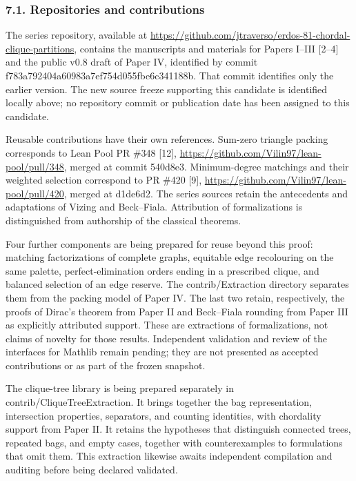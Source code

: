 \documentclass[english,11pt,a4paper]{article}
\begin{document}
\subsubsection{7.1. Repositories and contributions}\label{repositories-and-contributions}

The series repository, available at \url{https://github.com/jtraverso/erdos-81-chordal-clique-partitions}, contains the manuscripts and materials for Papers I--III {[}2--4{]} and the public v0.8 draft of Paper IV, identified by commit {\ttfamily\small f783a792404a\discretionary{\hbox{\ensuremath{\hookrightarrow}}}{}{}60983a7ef754\discretionary{\hbox{\ensuremath{\hookrightarrow}}}{}{}d055fbe6c341\discretionary{\hbox{\ensuremath{\hookrightarrow}}}{}{}188b}. That commit identifies only the earlier version. The new source freeze supporting this candidate is identified locally above; no repository commit or publication date has been assigned to this candidate.

Reusable contributions have their own references. Sum-zero triangle packing corresponds to Lean Pool PR \#348 {[}12{]}, \url{https://github.com/Vilin97/lean-pool/pull/348}, merged at commit {\ttfamily\small 540d8e3}. Minimum-degree matchings and their weighted selection correspond to PR \#420 {[}9{]}, \url{https://github.com/Vilin97/lean-pool/pull/420}, merged at {\ttfamily\small d1de6d2}. The series sources retain the antecedents and adaptations of Vizing and Beck--Fiala. Attribution of formalizations is distinguished from authorship of the classical theorems.

Four further components are being prepared for reuse beyond this proof: matching factorizations of complete graphs, equitable edge recolouring on the same palette, perfect-elimination orders ending in a prescribed clique, and balanced selection of an edge reserve. The {\ttfamily\small contrib/\discretionary{\hbox{\ensuremath{\hookrightarrow}}}{}{}Extraction} directory separates them from the packing model of Paper IV. The last two retain, respectively, the proofs of Dirac's theorem from Paper II and Beck--Fiala rounding from Paper III as explicitly attributed support. These are extractions of formalizations, not claims of novelty for those results. Independent validation and review of the interfaces for Mathlib remain pending; they are not presented as accepted contributions or as part of the frozen snapshot.

The clique-tree library is being prepared separately in {\ttfamily\small contrib/\discretionary{\hbox{\ensuremath{\hookrightarrow}}}{}{}CliqueTreeEx\discretionary{\hbox{\ensuremath{\hookrightarrow}}}{}{}traction}. It brings together the bag representation, intersection properties, separators, and counting identities, with chordality support from Paper II. It retains the hypotheses that distinguish connected trees, repeated bags, and empty cases, together with counterexamples to formulations that omit them. This extraction likewise awaits independent compilation and auditing before being declared validated.
\end{document}
